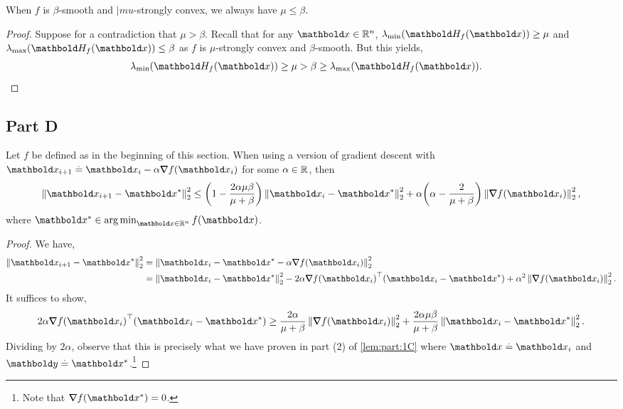 \documentclass{tufte-handout}
\begin{document}
\begin{lem}
When $f$ is $\beta$-smooth and $|mu$-strongly convex, we always have $\mu \leq \beta$.
\end{lem} \begin{proof}
Suppose for a contradiction that $\mu > \beta$. Recall that for any $\vx \in \R^n$, $\lmin(\mH_f(\vx)) \geq \mu$ and $\lmax(\mH_f(\vx)) \leq \beta$ as $f$ is $\mu$-strongly convex and $\beta$-smooth. But this yields, \begin{align*}
    \lmin(\mH_f(\vx)) \geq \mu > \beta \geq \lmax(\mH_f(\vx)). &\qedhere
\end{align*}
\end{proof}

\subsection{Part D}
\begin{lem}\label{lem:part:1D}
Let $f$ be defined as in the beginning of this section. When using a version of gradient descent with $\vx_{i+1} \defeq \vx_i - \alpha \grad f(\vx_i)$ for some $\alpha \in \mathbb{R}$, then \begin{align}
    \norm{\vx_{i+1} - \s{\vx}}_2^2 \leq \parentheses*{1-\frac{2\alpha\mu\beta}{\mu + \beta}}\norm{\vx_i - \s{\vx}}_2^2 + \alpha\parentheses*{\alpha - \frac{2}{\mu + \beta}}\norm{\grad f(\vx_i)}_2^2, \label{eq:part:1D}
\end{align} where $\s{\vx} \in \argmin_{\vx \in \R^n} f(\vx)$.
\end{lem}
\begin{proof} We have, \begin{align*}
    \norm{\vx_{i+1} - \s{\vx}}_2^2 &= \norm{\vx_i - \s{\vx} - \alpha \grad f(\vx_i)}_2^2 \\
    &= \norm{\vx_i - \s{\vx}}_2^2 - 2\alpha\trans{\grad f(\vx_i)}(\vx_i - \s{\vx}) + \alpha^2\norm{\grad f(\vx_i)}_2^2.
\end{align*} It suffices to show, \begin{align*}
    2\alpha\trans{\grad f(\vx_i)}(\vx_i - \s{\vx}) \geq \frac{2\alpha}{\mu + \beta}\norm{\grad f(\vx_i)}_2^2 + \frac{2\alpha\mu\beta}{\mu + \beta}\norm{\vx_i - \s{\vx}}_2^2.
\end{align*} Dividing by $2\alpha$, observe that this is precisely what we have proven in part (2) of \cref{lem:part:1C} where $\vx \defeq \vx_i$ and $\vy \defeq \s{\vx}$.\footnote{Note that $\grad f(\s{\vx}) = 0$.}
\end{proof}
\end{document}
